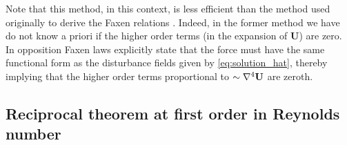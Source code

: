 Note that this method, in this context, is less efficient than the method used originally to derive the Faxen relations \citet{kim2013microhydrodynamics}. 
Indeed, in the former method we have do not know a priori if the higher order terms (in the expansion of $\textbf{U}$) are zero.
In opposition Faxen laws explicitly state that the force must have the same functional form as the disturbance fields given by \ref{eq:solution_hat}, thereby implying that the higher order terms proportional to $\sim \mathbf{\nabla}^4 \textbf{U}$ are zeroth. 


\subsection{Reciprocal theorem at first order in Reynolds number}

